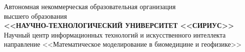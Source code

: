 \begin{spacing}{1.0}
\fontsize{12}{14.5}\selectfont
{}

\newlength{\signatureskip}
\setlength{\signatureskip}{0.25\normalbaselineskip}

\newcommand{\signatureblock}[2]{%
    #1 \newline%
    \uline{\strut\hfill #2}%
    \vspace{-\signatureskip} \newline \vspace{-\signatureskip}%
    \strut\qquad \textit{\scriptsize \quad (подпись)} \newline%
    <<\uline{\qquad}>>\uline{\qquad\qquad\qquad\qquad} {\the\year} г.%
}

\begin{center}
    Автономная некоммерческая образовательная организация \\ высшего образования \\
    \textbf{<<НАУЧНО-ТЕХНОЛОГИЧЕСКИЙ УНИВЕРСИТЕТ <<СИРИУС>>} \\
    \vspace{0.66\baselineskip}
    Научный центр информационных технологий и искусственного интеллекта \\
    \vspace{0.66\baselineskip}
    направление <<Математическое моделирование в биомедицине и геофизике>> \\

    \vspace{1.5\baselineskip}


    \vspace{\fill}

    {\large\MakeUppercase{\thetitle}} \\


\end{center}
\end{spacing}
